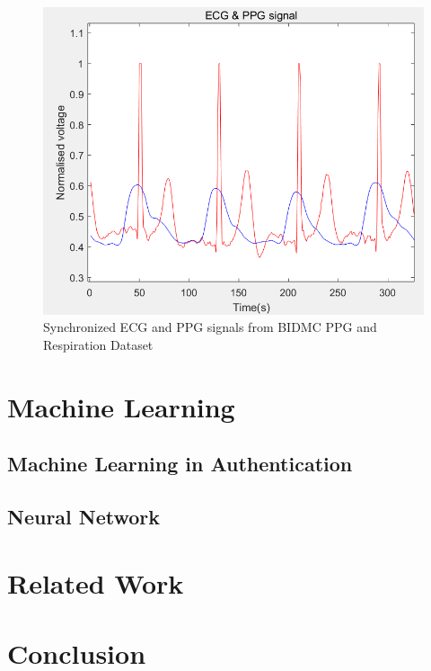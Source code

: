 \documentclass[a4paper,12pt]{article}
\begin{document}
\begin{figure}[H]
\centering
\includegraphics[width = .8\textwidth]{ecg_ppg.PNG}
\caption{Synchronized ECG and PPG signals from BIDMC PPG and Respiration Dataset\autocite{PhysioNet}}

\label{fig:ppg_ecg}
\end{figure}

\section{Machine Learning}
\subsection{Machine Learning in Authentication}
\subsection{Neural Network}

\section{Related Work}

\section{Conclusion}

\printbibliography
\end{document}
